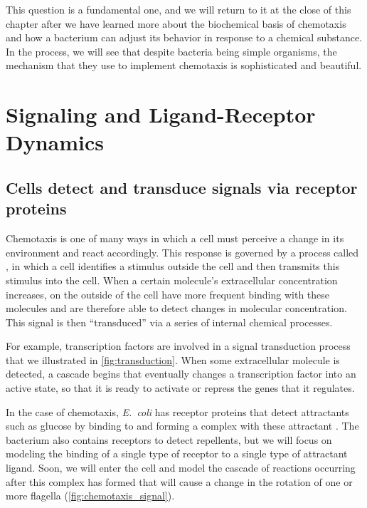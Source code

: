 This question is a fundamental one, and we will return to it at the close of this chapter after we have learned more about the biochemical basis of chemotaxis and how a bacterium can adjust its behavior in response to a chemical substance. In the process, we will see that despite bacteria being simple organisms, the mechanism that they use to implement chemotaxis is sophisticated and beautiful.\\


\FloatBarrier
{}
\section{Signaling and Ligand-Receptor Dynamics}
\label{sec:signal}

\subsection{Cells detect and transduce signals via receptor proteins}

Chemotaxis is one of many ways in which a cell must perceive a change in its environment and react accordingly. This response is governed by a process called , in which a cell identifies a stimulus outside the cell and then transmits this stimulus into the cell. When a certain molecule's extracellular concentration increases,  on the outside of the cell have more frequent binding with these molecules and are therefore able to detect changes in molecular concentration. This signal is then ``transduced'' via a series of internal chemical processes.

For example, transcription factors are involved in a signal transduction process that we illustrated in \autoref{fig:transduction}. When some extracellular molecule is detected, a cascade begins that eventually changes a transcription factor into an active state, so that it is ready to activate or repress the genes that it regulates.

In the case of chemotaxis, \textit{E.~coli} has receptor proteins that detect attractants such as glucose by binding to and forming a complex with these attractant . The bacterium also contains receptors to detect repellents, but we will focus on modeling the binding of a single type of receptor to a single type of attractant ligand. Soon, we will enter the cell and model the cascade of reactions occurring after this complex has formed that will cause a change in the rotation of one or more flagella (\autoref{fig:chemotaxis_signal}).\\

